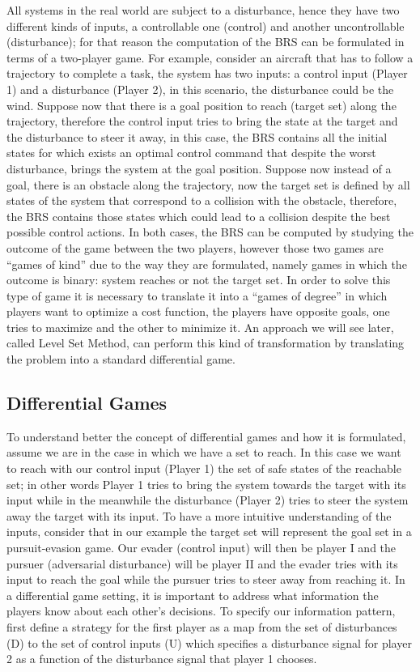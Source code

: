 All systems in the real world are subject to a disturbance, hence they have two different kinds of inputs, a controllable one (control) and another uncontrollable (disturbance); for that reason the computation of the BRS can be formulated in terms of a two-player game. For example, consider an aircraft that has to follow a trajectory to complete a task, the system has two inputs: a control input (Player 1) and a disturbance (Player 2), in this scenario, the disturbance could be the wind. Suppose now that there is a goal position to reach (target set) along the trajectory, therefore the control input tries to bring the state at the target and the disturbance to steer it away, in this case, the BRS contains all the initial states for which exists an optimal control command that despite the worst disturbance, brings the system at the goal position. Suppose now instead of a goal, there is an obstacle along the trajectory, now the target set is defined by all states of the system that correspond to a collision with the obstacle, therefore, the BRS contains those states which could lead to a collision despite the best possible control actions. In both cases, the BRS can be computed by studying the outcome of the game between the two players, however those two games are “games of kind” due to the way they are formulated, namely games in which the outcome is binary: system reaches or not the target set. In order to solve this type of game it is necessary to translate it into a “games of degree” in which players want to optimize a cost function, the players have opposite goals, one tries to maximize and the other to minimize it. An approach we will see later, called Level Set Method, can perform this kind of transformation by translating the problem into a standard differential game.

\subsection{Differential Games}
To understand better the concept of differential games and how it is formulated, assume we are in the case in which we have a set to reach. In this case we want to reach with our control input (Player 1) the set of safe states of the reachable set; in other words Player 1 tries to bring the system towards the target with its input while in the meanwhile the disturbance (Player 2) tries to steer the system away the target with its input. To have a  more intuitive understanding of the inputs, consider that in our example the target set will represent the goal set in a pursuit-evasion game. Our evader (control input) will then be player I and the pursuer (adversarial disturbance) will be player II and the evader tries with its input to reach the goal while the pursuer tries to steer away from reaching it.
In a differential game setting, it is important to address what information the players know about each other's decisions. To specify our information pattern, first define a strategy for the first player as a map  from the set of disturbances (D) to the set of control inputs (U)  which specifies a disturbance signal for player 2 as a function of the disturbance signal that player 1 chooses.

